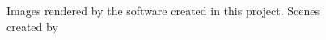 \documentclass[12pt]{ociamthesis}  %
\begin{document}
\begin{figure}[p]
        \caption{Images rendered by the software created in this project. Scenes created by \cite{resources16}}
        \label{figure front demo figures}
\end{figure}

\begin{romanpages}          %
\tableofcontents            %
\end{romanpages}            %








\end{document}
